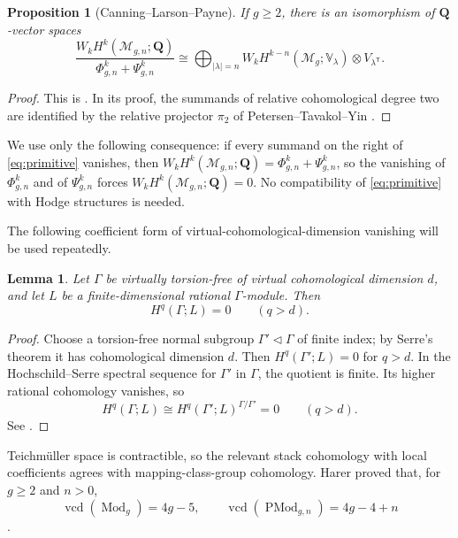 \documentclass[12pt,reqno]{amsart}
\newcommand{\Q}{\mathbf{Q}}
\newcommand{\M}{\mathcal{M}}
\newcommand{\Mod}{\operatorname{Mod}}
\newcommand{\PMod}{\operatorname{PMod}}
\newcommand{\vcd}{\operatorname{vcd}}
\newtheorem{proposition}[theorem]{Proposition}
\newtheorem{lemma}[theorem]{Lemma}
\theoremstyle{definition}
\theoremstyle{remark}
\begin{document}
\begin{proposition}[Canning--Larson--Payne]\label{prop:primitive}
If $g\geq2$, there is an isomorphism of $\Q$-vector spaces
\begin{equation}\label{eq:primitive}
 \frac{W_kH^k(\M_{g,n};\Q)}
      {\Phi^k_{g,n}+\Psi^k_{g,n}}
 \cong
 \bigoplus_{|\lambda|=n}
 W_kH^{k-n}(\M_g;\mathbb V_\lambda)
 \otimes V_{\lambda^{\mathsf T}}.
\end{equation}
\end{proposition}

\begin{proof}
This is \cite[Lemma~3.1(a)]{CLP}.  In its proof, the summands of relative
cohomological degree two are identified by the relative projector $\pi_2$
of Petersen--Tavakol--Yin \cite[Sections~5.1 and 5.2.2]{PTY}.
\end{proof}

We use only the following consequence: if every summand on the right of
\eqref{eq:primitive} vanishes, then
$W_kH^k(\M_{g,n};\Q)=\Phi^k_{g,n}+\Psi^k_{g,n}$, so the vanishing of
$\Phi^k_{g,n}$ and of $\Psi^k_{g,n}$ forces $W_kH^k(\M_{g,n};\Q)=0$.  No
compatibility of \eqref{eq:primitive} with Hodge structures is needed.

The following coefficient form of virtual-cohomological-dimension
vanishing will be used repeatedly.

\begin{lemma}\label{lem:vcd-rational}
Let $\Gamma$ be virtually torsion-free of virtual cohomological dimension
$d$, and let $L$ be a finite-dimensional rational $\Gamma$-module.  Then
\[
 H^q(\Gamma;L)=0\qquad(q>d).
\]
\end{lemma}

\begin{proof}
Choose a torsion-free normal subgroup $\Gamma'\triangleleft\Gamma$ of finite
index; by Serre's theorem it has cohomological dimension $d$.  Then
$H^q(\Gamma';L)=0$ for $q>d$.
In the Hochschild--Serre spectral sequence for $\Gamma'$ in $\Gamma$, the
quotient is finite.  Its higher rational cohomology vanishes, so
\[
 H^q(\Gamma;L)\cong H^q(\Gamma';L)^{\Gamma/\Gamma'}=0
 \qquad(q>d).
\]
See \cite[Chapters~VII and~VIII]{Brown}.
\end{proof}

Teichm\"uller space is contractible, so the relevant stack cohomology with
local coefficients agrees with mapping-class-group cohomology.  Harer proved
that, for $g\geq2$ and $n>0$,
\begin{equation}\label{eq:harer-vcd}
 \vcd(\Mod_g)=4g-5,
 \qquad
 \vcd(\PMod_{g,n})=4g-4+n
\end{equation}
\cite[Theorem~4.1]{Harer}.
\end{document}

